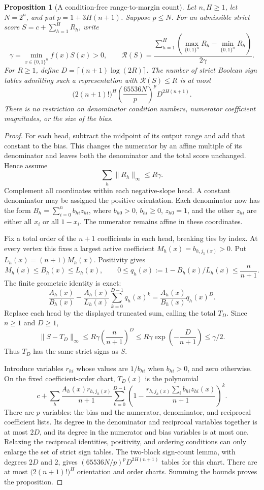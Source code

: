\documentclass[11pt]{article}
\newtheorem{proposition}{Proposition}
\newcommand{\Qn}{\{0,1\}^n}
\begin{document}
\begin{proposition}[A condition-free range-to-margin count]
Let $n,H\ge1$, let $N=2^n$, and put $p=1+3H(n+1)$. Suppose $p\le N$.
For an admissible strict score $S=c+\sum_{h=1}^H R_h$, write
\[
 \gamma=\min_{x\in\Qn}f(x)S(x)>0,\qquad
 \mathcal R(S)=\frac{\sum_{h=1}^H
             (\max_{\Qn}R_h-\min_{\Qn}R_h)}{2\gamma}.
\]
For $R\ge1$, define $D=\lceil(n+1)\log(2R)\rceil$.
The number of strict Boolean sign tables admitting such a representation
with $\mathcal R(S)\le R$ is at most
\[
 \bigl(2(n+1)!\bigr)^H
 \left(\frac{65536N}{p}\right)^p D^{2H(n+1)}.
\]
There is no restriction on denominator condition numbers, numerator
coefficient magnitudes, or the size of the bias.
\end{proposition}
\begin{proof}
For each head, subtract the midpoint of its output range and add that
constant to the bias. This changes the numerator by an affine multiple
of its denominator and leaves both the denominator and the total score
unchanged. Hence assume
\[
 \sum_h\|R_h\|_\infty\le R\gamma.
\]
Complement all coordinates within each negative-slope head. A constant
denominator may be assigned the positive orientation. Each denominator
now has the form $B_h=\sum_{i=0}^n b_{hi}z_{hi}$, where $b_{h0}>0$,
$b_{hi}\ge0$, $z_{h0}=1$, and the other $z_{hi}$ are either all $x_i$
or all $1-x_i$. The numerator remains affine in these coordinates.

Fix a total order of the $n+1$ coefficients in each head, breaking ties
by index. At every vertex this fixes a largest active coefficient
$M_h(x)=b_{h,j_h(x)}>0$. Put $L_h(x)=(n+1)M_h(x)$. Positivity gives
\[
 M_h(x)\le B_h(x)\le L_h(x),\qquad
 0\le q_h(x):=1-B_h(x)/L_h(x)\le\frac{n}{n+1}.
\]
The finite geometric identity is exact:
\[
 \frac{A_h(x)}{B_h(x)}-
 \frac{A_h(x)}{L_h(x)}\sum_{k=0}^{D-1}q_h(x)^k
 =\frac{A_h(x)}{B_h(x)}q_h(x)^D.
\]
Replace each head by the displayed truncated sum, calling the total
$T_D$. Since $n\ge1$ and $D\ge1$,
\[
 \|S-T_D\|_\infty
 \le R\gamma\left(\frac{n}{n+1}\right)^D
 \le R\gamma\exp\left(-\frac{D}{n+1}\right)
 \le\gamma/2.
\]
Thus $T_D$ has the same strict signs as $S$.

Introduce variables $r_{hi}$ whose values are $1/b_{hi}$ when
$b_{hi}>0$, and zero otherwise. On the fixed coefficient-order chart,
$T_D(x)$ is the polynomial
\[
 c+\sum_h\frac{A_h(x)r_{h,j_h(x)}}{n+1}
       \sum_{k=0}^{D-1}\left(
           1-\frac{r_{h,j_h(x)}\sum_i b_{hi}z_{hi}(x)}{n+1}
                       \right)^k.
\]
There are $p$ variables: the bias and the numerator, denominator, and
reciprocal coefficient lists. Its degree in the denominator and reciprocal variables together is
at most $2D$, and its degree in the numerator and bias variables is
at most one.
Relaxing the reciprocal identities, positivity, and ordering conditions
can only enlarge the set of strict sign tables. The two-block sign-count lemma, with degrees $2D$ and $2$, gives
$(65536N/p)^p D^{2H(n+1)}$ tables for this chart. There are at most
$\bigl(2(n+1)!\bigr)^H$ orientation and order charts. Summing the
bounds proves the proposition.
\end{proof}
\end{document}
